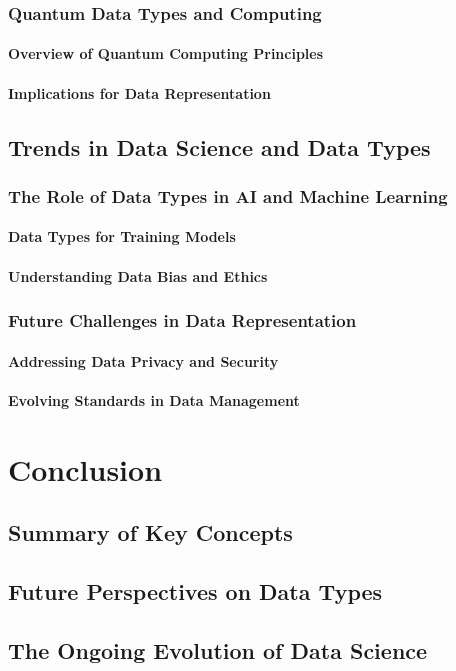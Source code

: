 \documentclass[12pt, oneside]{book}
\begin{document}
\subsection{Quantum Data Types and Computing}
\subsubsection{Overview of Quantum Computing Principles}
\subsubsection{Implications for Data Representation}
\section{Trends in Data Science and Data Types}
\subsection{The Role of Data Types in AI and Machine Learning}
\subsubsection{Data Types for Training Models}
\subsubsection{Understanding Data Bias and Ethics}
\subsection{Future Challenges in Data Representation}
\subsubsection{Addressing Data Privacy and Security}
\subsubsection{Evolving Standards in Data Management}

\chapter{Conclusion}
\section{Summary of Key Concepts}
\section{Future Perspectives on Data Types}
\section{The Ongoing Evolution of Data Science}
\end{document}
